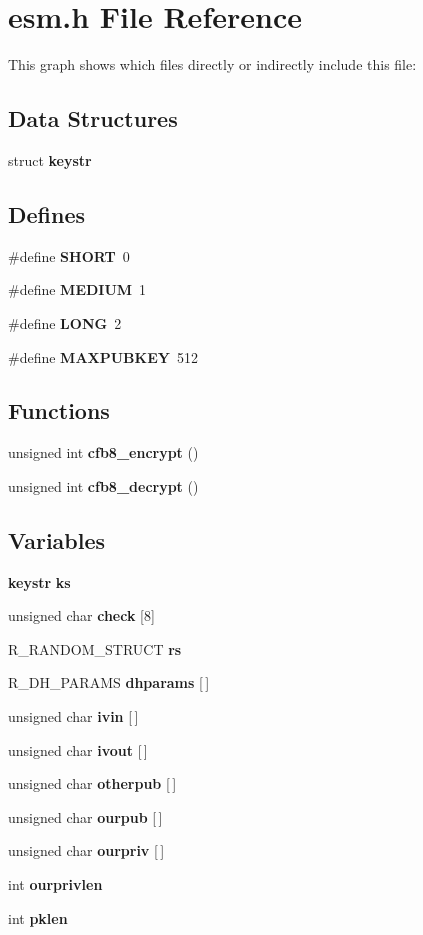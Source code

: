 \section{esm.h File Reference}
\label{esm_8h}




This graph shows which files directly or indirectly include this file:\subsection*{Data Structures}
\begin{CompactItemize}
\item 
struct {\bf keystr}
\end{CompactItemize}
\subsection*{Defines}
\begin{CompactItemize}
\item 
\#define {\bf SHORT}\ 0
\item 
\#define {\bf MEDIUM}\ 1
\item 
\#define {\bf LONG}\ 2
\item 
\#define {\bf MAXPUBKEY}\ 512
\end{CompactItemize}
\subsection*{Functions}
\begin{CompactItemize}
\item 
unsigned int {\bf cfb8\_\-encrypt} ()
\item 
unsigned int {\bf cfb8\_\-decrypt} ()
\end{CompactItemize}
\subsection*{Variables}
\begin{CompactItemize}
\item 
{\bf keystr} {\bf ks}
\item 
unsigned char {\bf check} [8]
\item 
R\_\-RANDOM\_\-STRUCT {\bf rs}
\item 
R\_\-DH\_\-PARAMS {\bf dhparams} [$\,$]
\item 
unsigned char {\bf ivin} [$\,$]
\item 
unsigned char {\bf ivout} [$\,$]
\item 
unsigned char {\bf otherpub} [$\,$]
\item 
unsigned char {\bf ourpub} [$\,$]
\item 
unsigned char {\bf ourpriv} [$\,$]
\item 
int {\bf ourprivlen}
\item 
int {\bf pklen}
\end{CompactItemize}


